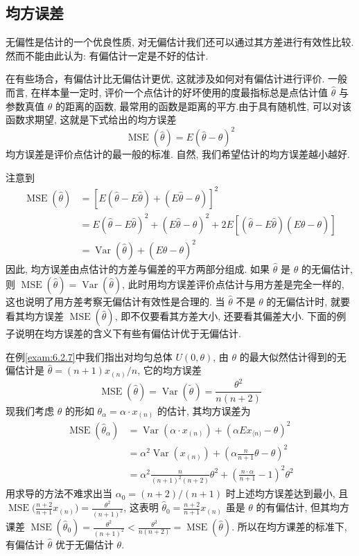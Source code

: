 \subsection{均方误差}

无偏性是估计的一个优良性质, 对无偏估计我们还可以通过其方差进行有效性比较. 然而不能由此认为: 有偏估计一定是不好的估计.

在有些场合，有偏估计比无偏估计更优, 这就涉及如何对有偏估计进行评价. 一般而言, 在样本量一定时, 评价一个点估计的好坏使用的度最指标总是点估计值 $\hat{\theta}$ 与参数真值 $\theta$ 的距离的函数, 最常用的函数是距离的平方.由于具有随机性, 可以对该函数求期望, 这就是下式给出的均方误差
\begin{equation}\label{eq:6.2.6}
\operatorname{MSE}(\hat{\theta})=E(\hat{\theta}-\theta)^{2}
\end{equation}
均方误差是评价点估计的最一般的标准. 自然, 我们希望估计的均方误差越小越好.

注意到
\begin{align*} 
\operatorname{MSE}(\hat{\theta}) 
&=[E(\hat{\theta}-E \hat{\theta})+(E \hat{\theta}-\theta)]^{2} \\ &=E(\hat{\theta}-E \hat{\theta})^{2}+(E \hat{\theta}-\theta)^{2}+2 E[(\hat{\theta}-E \hat{\theta})(E \hat{\theta}-\theta)] \\ &=\operatorname{Var}(\hat{\theta})+(E \hat{\theta}-\theta)^{2} \end{align*}
因此, 均方误差由点估计的方差与偏差的平方两部分组成. 如果 $\hat{\theta}$ 是 $\theta$ 的无偏估计, 则 $\operatorname{MSE}(\hat{\theta})=\operatorname{Var}(\hat{\theta})$, 此时用均方误差评价点估计与用方差是完全一样的, 这也说明了用方差考察无偏估计有效性是合理的. 当 $\hat{\theta}$ 不是 $\theta$ 的无偏估计时, 就要看其均方误差 $\operatorname{MSE}(\hat{\theta})$, 即不仅要看其方差大小, 还要看其偏差大小. 下面的例子说明在均方误差的含义下有些有偏估计优于无偏估计. 

\begin{example}
在例\ref{exam:6.2.7}中我们指出对均匀总体 $U(0,\theta)$, 由 $\theta$ 的最大似然估计得到的无偏估计是 $\hat{\theta}=(n+1)x_{(n)}/n$, 它的均方误差
\[\operatorname{MSE}(\hat{\theta})=\operatorname{Var}(\tilde{\theta})=\frac{\theta^{2}}{n(n+2)}\]
现我们考虑 $\theta$ 的形如 $\theta_\alpha=\alpha\cdot x_{(n)}$ 的估计, 其均方误差为
\begin{align*}
\operatorname{MSE}(\hat{\theta}_{\alpha}) 
&=\operatorname{Var}(\alpha \cdot x_{(n)})+(\alpha E x_{\langle n)}-\theta)^{2} \\ 
&=\alpha^{2} \operatorname{Var}(x_{(n)})+\left(\alpha \frac{n}{n+1} \theta-\theta\right)^{2} \\ 
&=\alpha^{2} \frac{n}{(n+1)^{2}(n+2)} \theta^{2}+\left(\frac{n \cdot \alpha}{n+1}-1\right)^{2} \theta^{2} 
\end{align*}
用求导的方法不难求出当 $\alpha_{0}=(n+2) /(n+1)$ 时上述均方误差达到最小, 且 $\operatorname{MSE}\big(\frac{n+2}{n+1} x_{(n)}\big)=\frac{\theta^{2}}{(n+1)^{2}}$, 这表明 $\hat{\theta}_{0}=\frac{n+2}{n+1} x_{(n)}$ 虽是 $\theta$ 的有偏估计, 但其均方课差 $\operatorname{MSE}(\hat{\theta}_{0})=\frac{\theta^{2}}{(n+1)^{2}}<\frac{\theta^{2}}{n(n+2)}=\operatorname{MSE}(\hat{\theta})$. 所以在均方课差的标准下, 有偏估计 $\hat\theta$ 优于无偏估计 $\theta$.
\end{example}

